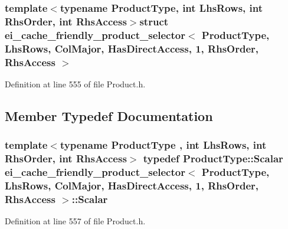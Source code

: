 \subsubsection*{template$<$typename Product\-Type, int Lhs\-Rows, int Rhs\-Order, int Rhs\-Access$>$struct ei\-\_\-cache\-\_\-friendly\-\_\-product\-\_\-selector$<$ Product\-Type, Lhs\-Rows, Col\-Major, Has\-Direct\-Access, 1, Rhs\-Order, Rhs\-Access $>$}



Definition at line 555 of file Product.\-h.



\subsection{Member Typedef Documentation}
\hypertarget{structei__cache__friendly__product__selector_3_01_product_type_00_01_lhs_rows_00_01_col_major_00d6a68bd0827e14ef88646c749f85d9a1_ad570b476d0c072b2c5d4ca2fff9a09d3}{
\subsubsection[{Scalar}]{\setlength{\rightskip}{0pt plus 5cm}template$<$typename Product\-Type , int Lhs\-Rows, int Rhs\-Order, int Rhs\-Access$>$ typedef Product\-Type\-::\-Scalar {\bf ei\-\_\-cache\-\_\-friendly\-\_\-product\-\_\-selector}$<$ Product\-Type, Lhs\-Rows, {\bf Col\-Major}, {\bf Has\-Direct\-Access}, 1, Rhs\-Order, Rhs\-Access $>$\-::{\bf Scalar}}}\label{structei__cache__friendly__product__selector_3_01_product_type_00_01_lhs_rows_00_01_col_major_00d6a68bd0827e14ef88646c749f85d9a1_ad570b476d0c072b2c5d4ca2fff9a09d3}


Definition at line 557 of file Product.\-h.




